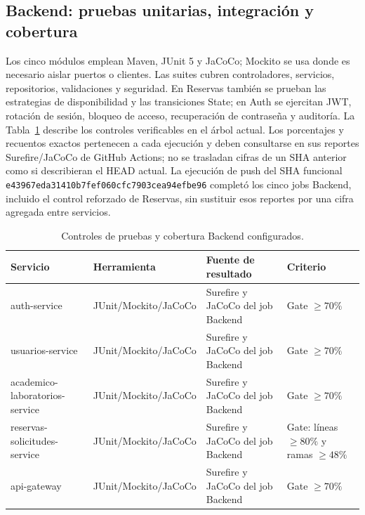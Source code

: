 \subsection{Backend: pruebas unitarias, integración y cobertura}
\label{subsec:pruebas-backend}

Los cinco módulos emplean Maven, JUnit 5 y JaCoCo; Mockito se usa donde es
necesario aislar puertos o clientes. Las suites cubren controladores, servicios,
repositorios, validaciones y seguridad. En Reservas también se prueban las
estrategias de disponibilidad y las transiciones State; en Auth se ejercitan JWT,
rotación de sesión, bloqueo de acceso, recuperación de contraseña y auditoría.
La Tabla~\ref{tab:cobertura-backend} describe los controles verificables en el
árbol actual. Los porcentajes y recuentos exactos pertenecen a cada ejecución y
deben consultarse en sus reportes Surefire/JaCoCo de GitHub Actions; no se
trasladan cifras de un SHA anterior como si describieran el HEAD actual.
La ejecución de push del SHA funcional
\texttt{e43967eda31410b7fef060cfc7903cea94efbe96} completó los cinco jobs
Backend, incluido el control reforzado de Reservas, sin sustituir esos reportes
por una cifra agregada entre servicios.

\begin{table}[t]
  \centering
  \small
  \caption{Controles de pruebas y cobertura Backend configurados.}
  \label{tab:cobertura-backend}
  \begin{tabular}{|p{}|p{}|p{}|p{}|}
    \hline
    \textbf{Servicio} & \textbf{Herramienta} & \textbf{Fuente de resultado} & \textbf{Criterio} \\
    \hline
    auth-service & JUnit/Mockito/JaCoCo & Surefire y JaCoCo del job Backend & Gate $\geq 70\%$ \\
    \hline
    usuarios-service & JUnit/Mockito/JaCoCo & Surefire y JaCoCo del job Backend & Gate $\geq 70\%$ \\
    \hline
    academico-laboratorios-service & JUnit/Mockito/JaCoCo & Surefire y JaCoCo del job Backend & Gate $\geq 70\%$ \\
    \hline
    reservas-solicitudes-service & JUnit/Mockito/JaCoCo & Surefire y JaCoCo del job Backend & Gate: líneas $\geq80\%$ y ramas $\geq48\%$ \\
    \hline
    api-gateway & JUnit/Mockito/JaCoCo & Surefire y JaCoCo del job Backend & Gate $\geq 70\%$ \\
    \hline
  \end{tabular}
\end{table}

